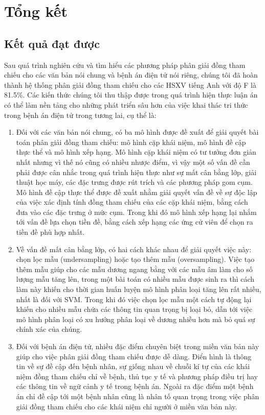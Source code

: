 \chapter{Tổng kết}

\section{Kết quả đạt được}
Sau quá trình nghiên cứu và tìm hiểu các phương pháp phân giải đồng tham chiếu cho các văn bản nói chung và bệnh án điện tử nói riêng, chúng tôi đã hoàn thành hệ thống phân giải đồng tham chiếu cho các HSXV tiếng Anh với độ F là 81.5\%. Các kiến thức chúng tôi thu thập được trong quá trình hiện thực luận án có thể làm nền tảng cho những phát triển sâu hơn của việc khai thác tri thức trong bệnh án điện tử trong tương lai, cụ thể là:
\begin{enumerate}
\item Đối với các văn bản nói chung, có ba mô hình được đề xuất để giải quyết bài toán phân giải đồng tham chiếu: mô hình cặp khái niệm, mô hình đề cập thực thể và mô hình xếp hạng. Mô hình cặp khái niệm có tư tưởng đơn giản nhất nhưng vì thế nó cũng có nhiều nhược điểm, vì vậy một số vấn đề cần phải được cân nhắc trong quá trình hiện thực như sự mất cân bằng lớp, giải thuật học máy, các đặc trưng được rút trích và các phương pháp gom cụm. Mô hình đề cập thực thể được đề xuất nhằm giải quyết vấn đề về sự độc lập của việc xác định tính đồng tham chiếu của các cặp khái niệm, bằng cách đưa vào các đặc trưng ở mức cụm. Trong khi đó mô hình xếp hạng lại nhắm tới vấn đề lựa chọn tiền đề, bằng cách xếp hạng các ứng cử viên để chọn ra tiền đề phù hợp nhất. 
\item Về vấn đề mất cân bằng lớp, có hai cách khác nhau để giải quyết việc này: chọn lọc mẫu (undersampling) hoặc tạo thêm mẫu (oversampling). Việc tạo thêm mẫu giúp cho các mẫu dương ngang bằng với các mẫu âm làm cho số lượng mẫu tăng lên, trong một bài toán có nhiều mẫu được sinh ra thì cách làm này khiến cho thời gian huấn luyện mô hình phân loại tăng lên rất nhiều, nhất là đối với SVM. Trong khi đó việc chọn lọc mẫu một cách tự động lại khiến cho nhiều mẫu chứa các thông tin quan trọng bị loại bỏ, dẫn tới việc mô hình phân loại có xu hướng phân loại về dương nhiều hơn mà bỏ quá sự chính xác của chúng.
\item Đối với bệnh án điện tử, nhiều đặc điểm chuyên biệt trong miền văn bản này giúp cho việc phân giải đồng tham chiếu được dễ dàng. Điển hình là thông tin về sự đề cập đến bệnh nhân, sự giống nhau về chuỗi kí tự của các khái niệm đồng tham chiếu chỉ về bệnh, thủ tục y tế và phương pháp điều trị hay các thông tin về ngữ cảnh y tế trong bệnh án. Ngoài ra đặc điểm một bệnh án chỉ đề cập tới một bệnh nhân cũng là nhân tố quan trọng trong việc phân giải đồng tham chiếu cho các khái niệm chỉ người ở miền văn bản này.
\end{enumerate}

